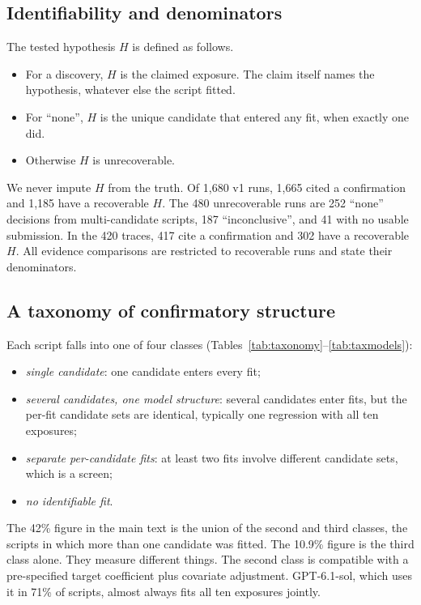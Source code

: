 \subsection{Identifiability and denominators}
\label{app:instr-ident}
The tested hypothesis $H$ is defined as follows.
\begin{itemize}
\item For a discovery, $H$ is the claimed exposure. The claim itself names
the hypothesis, whatever else the script fitted.
\item For ``none'', $H$ is the unique candidate that entered any fit, when
exactly one did.
\item Otherwise $H$ is unrecoverable.
\end{itemize}
We never impute $H$ from the truth. Of 1,680 v1 runs, 1,665 cited a
confirmation and 1,185 have a recoverable $H$. The 480 unrecoverable runs
are 252 ``none'' decisions from multi-candidate scripts, 187
``inconclusive'', and 41 with no usable submission. In the 420 
traces, 417 cite a confirmation and 302 have a recoverable $H$. All evidence
comparisons are restricted to recoverable runs and state their denominators.

\subsection{A taxonomy of confirmatory structure}
\label{app:instr-tax}
Each script falls into one of four classes
(Tables~\ref{tab:taxonomy}--\ref{tab:taxmodels}):
\begin{itemize}
\item \emph{single candidate}: one candidate enters every fit;
\item \emph{several candidates, one model structure}: several candidates enter
fits, but the per-fit candidate sets are identical, typically one regression
with all ten exposures;
\item \emph{separate per-candidate fits}: at least two fits involve different
candidate sets, which is a screen;
\item \emph{no identifiable fit}.
\end{itemize}
The 42\% figure in the main text is the union of the second and third
classes, the scripts in which more than one candidate was fitted. The 10.9\%
figure is the third class alone. They measure different things. The second
class is compatible with a pre-specified target coefficient plus covariate
adjustment. GPT-6.1-sol, which uses it in 71\% of scripts, almost always
fits all ten exposures jointly.

